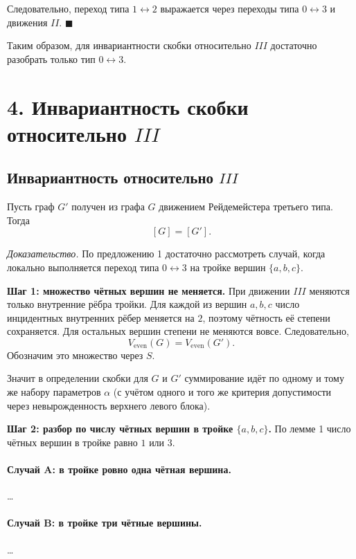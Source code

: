 \documentclass[12pt,a4paper]{article}
\begin{document}
Следовательно, переход типа $1\leftrightarrow 2$ выражается через переходы типа
$0\leftrightarrow 3$ и движения $II$. $\blacksquare$

Таким образом, для инвариантности скобки относительно $III$ достаточно разобрать только
тип $0\leftrightarrow 3$.

\section*{4. Инвариантность скобки относительно $III$}

\subsection*{Инвариантность относительно $III$}

Пусть граф $G'$ получен из графа $G$ движением Рейдемейстера третьего типа.
Тогда
\[
[G]=[G'].
\]

\textit{Доказательство.}
По предложению 1 достаточно рассмотреть случай, когда локально выполняется переход
типа $0\leftrightarrow 3$ на тройке вершин $\{a,b,c\}$.

\textbf{Шаг 1: множество чётных вершин не меняется.}
При движении $III$ меняются только внутренние рёбра тройки.
Для каждой из вершин $a,b,c$ число инцидентных внутренних рёбер меняется на $2$,
поэтому чётность её степени сохраняется. Для остальных вершин степени не меняются вовсе.
Следовательно,
\[
V_{\mathrm{even}}(G)=V_{\mathrm{even}}(G').
\]
Обозначим это множество через $S$.

Значит в определении скобки для $G$ и $G'$ суммирование идёт по одному и тому же набору
параметров $\alpha$ (с учётом одного и того же критерия допустимости через невырожденность
верхнего левого блока).

\textbf{Шаг 2: разбор по числу чётных вершин в тройке $\{a,b,c\}$.}
По лемме 1 число чётных вершин в тройке равно $1$ или $3$.

\paragraph{Случай A: в тройке ровно одна чётная вершина.}
\ldots

\paragraph{Случай B: в тройке три чётные вершины.}
\ldots
\end{document}
